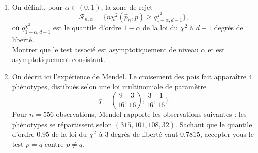\begin{enumerate}
\begin{enumerate}
\item On définit, pour $\alpha \in (0,1)$, la zone de rejet
\[\mathcal R_{n,\alpha}=\{n\chi^2(\hat p_n,p)\geq q_{1-\alpha, d-1}^{\chi^2}\},\]
où $q_{1-\alpha, d-1}^{\chi^2}$ est le quantile d'ordre $1-\alpha$ de la loi du $\chi^2$ à $d-1$ degrés de liberté.\\
Montrer que le test associé est asymptotiquement de niveau $\alpha$ et est asymptotiquement consistant.
\item{} On décrit ici l'expérience de Mendel. Le croisement des pois fait apparaître $4$ phénotypes, distibués selon une loi multinomiale de paramètre
\[ q =(\frac{9}{16},\frac{3}{16}),\frac{3}{16},\frac{1}{16}).\]
Pour $n=556$ observations, Mendel rapporte les observations suivantes : les phénotypes se répartissent selon $(315,101,108,32)$. Sachant que le quantile d'ordre $0.95$ de la loi du $\chi^2$ à $3$ degrés de liberté vaut $0.7815$, accepter vous le test $p=q$ contre $p\neq q$.
\end{enumerate}

\end{enumerate}
